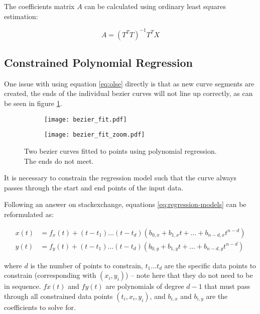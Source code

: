 The coefficients matrix $A$ can be calculated using ordinary least squares estimation:

\begin{equation}
    A = (T^T T)^{-1} T^T X
    \label{eq:olse}
\end{equation}

\subsection{Constrained Polynomial Regression}

One issue with using equation \ref{eq:olse} directly is that as new curve segments are created, the ends of the individual bezier curves will not line up correctly, as can be seen in figure \ref{fig:bezier_fit}.

\begin{figure}
    \centering
    \begin{subfigure}{.45\linewidth}
        \centering
        \texttt{[image: bezier\_fit.pdf]}
        \caption{}
    \end{subfigure}
        \begin{subfigure}{.45\linewidth}
        \centering
        \texttt{[image: bezier\_fit\_zoom.pdf]}
        \caption{}
    \end{subfigure}
    \caption{Two bezier curves fitted to points using polynomial regression.\\The ends do not meet.}
    \label{fig:bezier_fit}
\end{figure}

It is necessary to constrain the regression model such that the curve always passes through the start and end points of the input data.

Following an answer on stackexchange\cite{web:constrained-regression}, equations \ref{eq:regression-models} can be reformulated as:

\begin{align}
    x(t) &= f_x(t) + (t-t_1)\ldots(t-t_d)(b_{0,x} + b_{1,x} t + \ldots + b_{n-d,x} t^{n-d}) \\
    y(t) &= f_y(t) + (t-t_1)\ldots(t-t_d)(b_{0,y} + b_{1,y} t + \ldots + b_{n-d,y} t^{n-d})
\end{align}

where $d$ is the number of points to constrain, $t_1 \ldots t_d$ are the specific data points to constrain (corresponding with $(x_i,y_i)$) -- note here that they do not need to be in sequence. $fx(t)$ and $fy(t)$ are polynomials of degree $d-1$ that must pass through all constrained data points $(t_i,x_i,y_i)$, and $b_{i,x}$ and $b_{i,y}$ are the coefficients to solve for.

